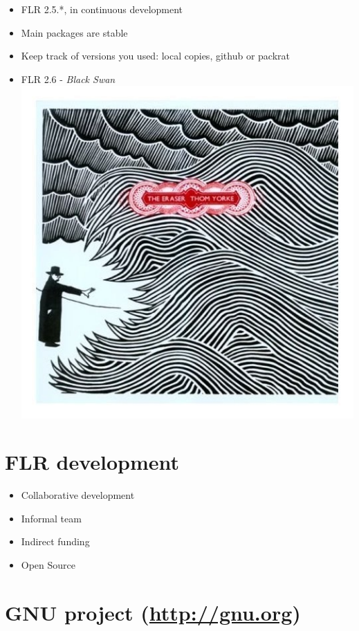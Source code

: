 \documentclass[]{article}
\providecommand{\tightlist}{%
  \setlength{\itemsep}{0pt}\setlength{\parskip}{0pt}}
\begin{document}
\begin{itemize}
\tightlist
\item
  FLR 2.5.*, in continuous development
\item
  Main packages are stable
\item
  Keep track of versions you used: local copies, github or packrat
\item
  FLR 2.6 - \emph{Black Swan}
  \hfill\includegraphics[keepaspectratio, height=0.15\textheight]{graphics/theeraser.jpg}
\end{itemize}

\section{FLR development}\label{flr-development}

\begin{itemize}
\tightlist
\item
  Collaborative development
\item
  Informal team
\item
  Indirect funding
\item
  Open Source
\end{itemize}

\section{\texorpdfstring{GNU project
(\url{http://gnu.org})}{GNU project (http://gnu.org)}}\label{gnu-project-httpgnu.org}
\end{document}
